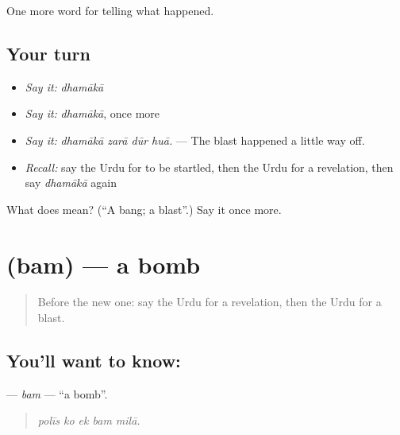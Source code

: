\begin{grammarlens}[title={What you've built}]
One more word for telling what happened.
\end{grammarlens}

\subsection*{Your turn}
\begin{itemize}
\raggedright
  \item \emph{Say it:} \emph{dhamākā}
  \item \emph{Say it:} \emph{dhamākā}, once more
  \item \emph{Say it:} \emph{dhamākā zarā dūr huā.} — The blast happened a little way off.
  \item \emph{Recall:} say the Urdu for to be startled, then the Urdu for a revelation, then say \emph{dhamākā} again
\end{itemize}

\begin{tcolorbox}[breakable,colback=teal!4,colframe=teal!35!black,title={Before you move on}]
What does  mean? (\textquotedblleft{}A bang; a blast\textquotedblright{}.) Say it once more.
\end{tcolorbox}
\section[\texorpdfstring{\ur{بم} (bam)}{بم (bam)}]{ (bam) — a bomb}

\label{lesson:UR-C306-bam}



\begin{quote}
Before the new one: say the Urdu for a revelation, then the Urdu for a blast.
\end{quote}

\subsection*{You'll want to know: }
\textbf{} — \emph{bam} — \textquotedblleft{}a bomb\textquotedblright{}.

\begin{quote}
    
\end{quote}

\begin{quote}
\emph{polīs ko ek bam milā.}
\end{quote}

